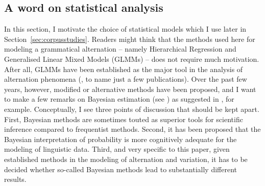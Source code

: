 \documentclass[USenglish]{article}
\begin{document}

\subsection{A word on statistical analysis}
\label{sec:rightstatistics}

In this section, I motivate the choice of statistical models which I use later in Section~\ref{sec:corpusstudies}.
Readers might think that the methods used here for modeling a grammatical alternation -- namely Hierarchical Regression and Generalised Linear Mixed Models (GLMMs) -- does not require much motivation.
After all, GLMMs have been established as the major tool in the analysis of alternation phenomena (\citealp{BresnanEa2007,BresnanHay2010,BresnanFord2010,DivjakArppe2013,Gries2015,NessetJanda2010}, to name just a few publications).
Over the past few years, however, modified or alternative methods have been proposed, and I want to make a few remarks on Bayesian estimation (see \citealp{GelmanEa2014}) as suggested in \cite{Levshina2016,Divjak2016a}, for example.
Conceptually, I see three points of discussion that should be kept apart.
First, Bayesian methods are sometimes touted as superior tools for scientific inference compared to frequentist methods.
Second, it has been proposed that the Bayesian interpretation of probability is more cognitively adequate for the modeling of linguistic data.
Third, and very specific to this paper, given established methods in the modeling of alternation and variation, it has to be decided whether so-called Bayesian methods lead to substantially different results.
\end{document}
